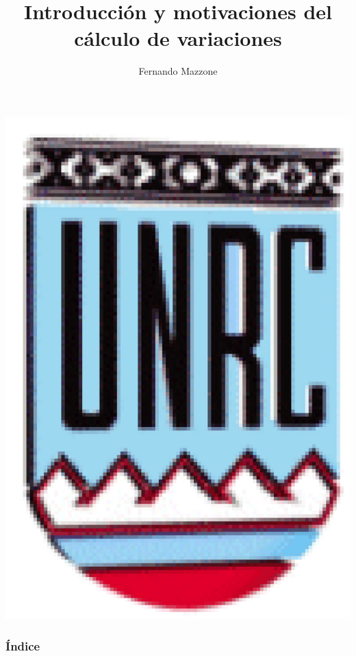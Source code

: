 \documentclass[handout,hyperref={colorlinks=true}]{beamer}
\title[Cálculo de variaciones] %
{%
Introducción y motivaciones del cálculo de variaciones
}
\author[] %
{Fernando Mazzone}
\institute[Depto de Matemática] %
{
 Dpto de Matemática\\
Facultad de Ciencias Exactas Físico-Químicas y Naturales\\
Universidad Nacional de Río Cuarto
 Dpto de Matemática\\
Facultad de Ciencias Exactas y Naturales\\
Universidad Nacional de La Pampa\\
CONICET}
\begin{document}
\begin{frame}
  \maketitle
  \begin{center}
   \includegraphics[scale=0.2]{imagenes/unrc.jpg}
   \end{center}
\end{frame}
\begin{frame}
    \frametitle{Índice}
\tableofcontents

\end{frame}
\end{document}
